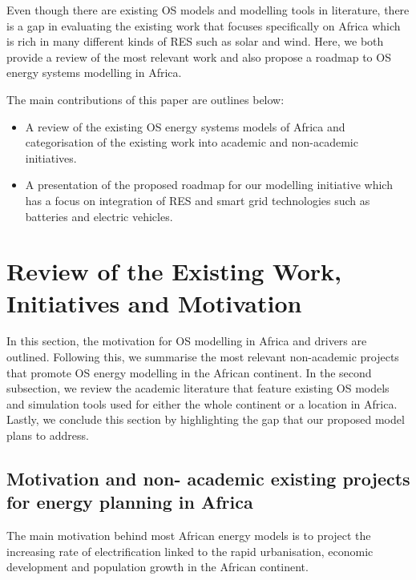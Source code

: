 \documentclass[conference, a4paper]{IEEEtran}
\begin{document}
Even though there are existing OS models and modelling tools in literature, there is a gap in evaluating the existing work that focuses specifically on Africa which is rich in many different kinds of RES such as solar and wind.
Here, we both provide a review of the most relevant work and also propose a roadmap to OS energy systems modelling in Africa.

The main contributions of this paper are outlines below:
\begin{itemize}
    \item A review of the existing OS energy systems models of Africa and categorisation of the existing work into academic and non-academic initiatives.
    \item A presentation of the proposed roadmap for our modelling initiative which has a focus on integration of RES and smart grid technologies such as batteries and electric vehicles.
\end{itemize}


\section{Review of the Existing Work, Initiatives and Motivation}
In this section, the motivation for OS modelling in Africa and drivers are outlined.
Following this, we summarise the most relevant non-academic projects that promote OS energy modelling in the African continent. In the second subsection, we review the academic literature that feature existing OS models and simulation tools used for either the whole continent or a location in Africa. Lastly, we conclude this section by highlighting the gap that our proposed model plans to address.

\subsection{Motivation and non- academic existing projects for energy planning in Africa}
The main motivation behind most African energy models is to project the increasing rate of electrification linked to the rapid urbanisation, economic development and population growth in the African continent. 
\end{document}

